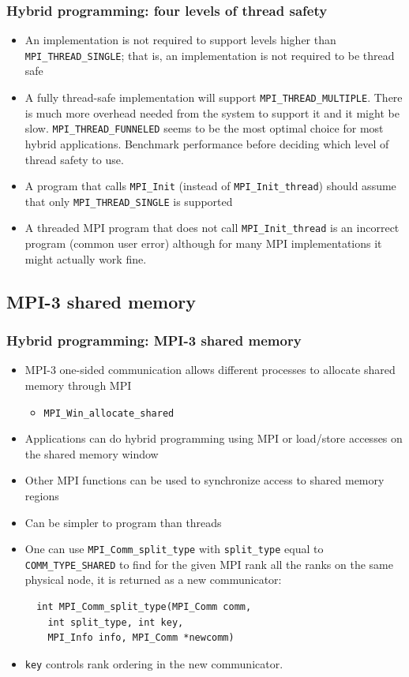 \documentclass{beamer}
\begin{document}
\begin{frame}[fragile]
  \frametitle{Hybrid programming: four levels of thread safety}
\begin{itemize}
\item An implementation is not required to support levels higher than {\color{mycolorcode}\verb|MPI_THREAD_SINGLE|}; that is, an implementation is not required to be thread safe
\item A fully thread-safe implementation will support {\color{mycolorcode}\verb|MPI_THREAD_MULTIPLE|}. There is much more overhead needed from the system to support it and it might be slow. 
{\color{mycolorcode}\verb|MPI_THREAD_FUNNELED|} seems to be the most optimal choice for most hybrid applications. Benchmark performance before deciding which level of thread safety to use.
\item A program that calls {\color{mycolorcode}\verb|MPI_Init|} (instead of {\color{mycolorcode}\verb|MPI_Init_thread|}) should assume that only {\color{mycolorcode}\verb|MPI_THREAD_SINGLE|} is supported
\item A threaded MPI program that does not call {\color{mycolorcode}\verb|MPI_Init_thread|} is an incorrect program (common user error) although for many MPI implementations it might actually work fine.
\end{itemize}
\end{frame}

\subsection{MPI-3 shared memory}
\begin{frame}[fragile]
  \frametitle{Hybrid programming: MPI-3 shared memory}
\begin{itemize}
\item MPI-3 one-sided communication allows different processes to allocate shared memory through MPI
\begin{itemize}
\item {\color{mycolorcode}\verb|MPI_Win_allocate_shared|}
\end{itemize}
\item Applications can do hybrid programming using MPI or load/store accesses on the shared memory window
\item Other MPI functions can be used to synchronize access to shared memory regions
\item Can be simpler to program than threads
\item One can use {\color{mycolorcode}\verb|MPI_Comm_split_type|} with {\color{mycolorcode}\verb|split_type|} equal to {\color{mycolorcode}\verb|COMM_TYPE_SHARED|} to find for the given MPI rank all the ranks on the same physical node, it is returned as a new communicator:
{\color{mycolorcode}
\begin{verbatim}
  int MPI_Comm_split_type(MPI_Comm comm, 
    int split_type, int key,
    MPI_Info info, MPI_Comm *newcomm)
\end{verbatim}
}
\item {\color{mycolorcode}\verb|key|} controls rank ordering in the new communicator.
\end{itemize}
\end{frame}
\end{document}
